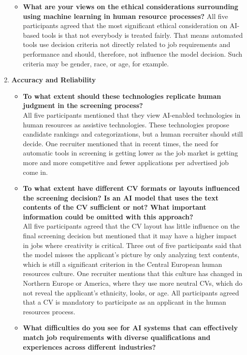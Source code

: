 \documentclass[draft,final]{thesisclass} %
\begin{document}
\begin{enumerate}
\begin{itemize}
        \item \textbf{What are your views on the ethical considerations surrounding using machine learning in human resource processes?}
        All five participants agreed that the most significant ethical consideration on \acs{AI}-based tools is that not everybody is treated fairly. That means automated tools use decision criteria not directly related to job requirements and performance and should, therefore, not influence the model decision. Such criteria may be gender, race, or age, for example.
    \end{itemize}
    \item \textbf{Accuracy and Reliability}
    \begin{itemize}
        \item \textbf{To what extent should these technologies replicate human judgment in the screening process?}\\
        All five participants mentioned that they view \acs{AI}-enabled technologies in human resources as assistive technologies.
        These technologies propose candidate rankings and categorizations, but a human recruiter should still decide. One recruiter mentioned that in recent times, the need for automatic tools in screening is getting lower as the job market is getting more and more competitive and fewer applications per advertised job come in.
        \item \textbf{To what extent have different \acs{CV} formats or layouts influenced the screening decision? Is an \acs{AI} model that uses the text contents of the \acs{CV} sufficient or not? What important information could be omitted with this approach?}\\
        All five participants agreed that the \acs{CV} layout has little influence on the final screening decision but mentioned that it may have a higher impact in jobs where creativity is critical. Three out of five participants said that the model misses the applicant's picture by only analyzing text contents, which is still a significant criterion in the Central European human resources culture. One recruiter mentions that this culture has changed in Northern Europe or America, where they use more neutral \acs{CV}s, which do not reveal the applicant's ethnicity, looks, or age. All participants agreed that a \acs{CV} is mandatory to participate as an applicant in the human resources process.
        \item \textbf{What difficulties do you see for \acs{AI} systems that can effectively match job requirements with diverse qualifications and experiences across different industries?}\\

\end{itemize}
\end{enumerate}
\end{document}

